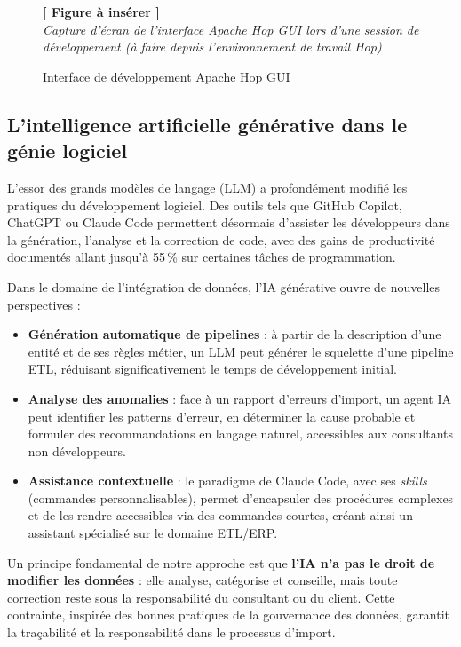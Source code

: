 \documentclass[a4paper,12pt]{article}
\newcommand{\insertfig}[3][0.80]{%
  \begin{figure}[H]
  \centering
  \colorbox{placeholderbg}{\parbox{#1\textwidth}{%
    \vspace{1.6cm}
    \centering
    {\large\color{placeholderborder}\textbf{[ Figure à insérer ]}}\\[0.5cm]
    {\small\color{gray}\textit{#2}}%
    \vspace{1.6cm}
  }}
  \caption{#3}
  \end{figure}
}
\begin{document}
\insertfig{Capture d'écran de l'interface Apache Hop GUI lors d'une session de développement (à faire depuis l'environnement de travail Hop)}{Interface de développement Apache Hop GUI}

\subsection{L'intelligence artificielle générative dans le génie logiciel}

L'essor des grands modèles de langage (LLM) a profondément modifié les pratiques du développement logiciel. Des outils tels que GitHub Copilot, ChatGPT ou Claude Code permettent désormais d'assister les développeurs dans la génération, l'analyse et la correction de code, avec des gains de productivité documentés allant jusqu'à 55\,\% sur certaines tâches de programmation.

Dans le domaine de l'intégration de données, l'IA générative ouvre de nouvelles perspectives :

\begin{itemize}
  \item \textbf{Génération automatique de pipelines} : à partir de la description d'une entité et de ses règles métier, un LLM peut générer le squelette d'une pipeline ETL, réduisant significativement le temps de développement initial.
  \item \textbf{Analyse des anomalies} : face à un rapport d'erreurs d'import, un agent IA peut identifier les patterns d'erreur, en déterminer la cause probable et formuler des recommandations en langage naturel, accessibles aux consultants non développeurs.
  \item \textbf{Assistance contextuelle} : le paradigme de Claude Code, avec ses \textit{skills} (commandes personnalisables), permet d'encapsuler des procédures complexes et de les rendre accessibles via des commandes courtes, créant ainsi un assistant spécialisé sur le domaine ETL/ERP.
\end{itemize}

Un principe fondamental de notre approche est que \textbf{l'IA n'a pas le droit de modifier les données} : elle analyse, catégorise et conseille, mais toute correction reste sous la responsabilité du consultant ou du client. Cette contrainte, inspirée des bonnes pratiques de la gouvernance des données, garantit la traçabilité et la responsabilité dans le processus d'import.
\end{document}
